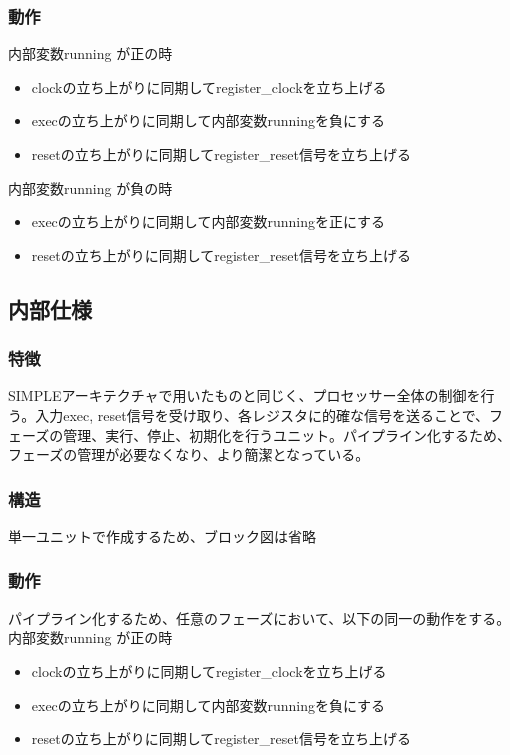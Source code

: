 \documentclass{jsreport}
\begin{document}
        \subsubsection{動作}
        	内部変数running が正の時
            \begin{itemize}
        		\item clockの立ち上がりに同期してregister\_clockを立ち上げる
            	\item execの立ち上がりに同期して内部変数runningを負にする
                \item resetの立ち上がりに同期してregister\_reset信号を立ち上げる
            \end{itemize}
            
            内部変数running が負の時
            \begin{itemize}
            	\item execの立ち上がりに同期して内部変数runningを正にする
                \item resetの立ち上がりに同期してregister\_reset信号を立ち上げる
            \end{itemize}

    \subsection{内部仕様}
        \subsubsection{特徴}
			SIMPLEアーキテクチャで用いたものと同じく、プロセッサー全体の制御を行う。入力exec, reset信号を受け取り、各レジスタに的確な信号を送ることで、フェーズの管理、実行、停止、初期化を行うユニット。パイプライン化するため、フェーズの管理が必要なくなり、より簡潔となっている。
            
        \subsubsection{構造}
        	単一ユニットで作成するため、ブロック図は省略
            
        \subsubsection{動作}
        	パイプライン化するため、任意のフェーズにおいて、以下の同一の動作をする。\\
            内部変数running が正の時
            \begin{itemize}
        		\item clockの立ち上がりに同期してregister\_clockを立ち上げる
            	\item execの立ち上がりに同期して内部変数runningを負にする
                \item resetの立ち上がりに同期してregister\_reset信号を立ち上げる
            \end{itemize}
            
\end{document}
